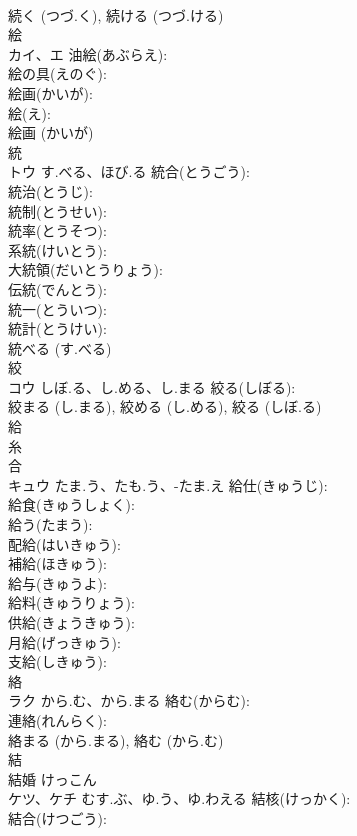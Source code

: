 \documentclass[8pt]{extreport}
\begin{document}
\begin{CJK}{UTF8}{min}
\\	続く (つづ.く), 続ける (つづ.ける)
\\	絵			
\\	カイ、エ		油絵(あぶらえ): 
\\	絵の具(えのぐ): 
\\	絵画(かいが): 
\\	絵(え): 
\\	絵画 (かいが)
\\	統			
\\	トウ	す.べる、ほび.る	統合(とうごう): 
\\	統治(とうじ): 
\\	統制(とうせい): 
\\	統率(とうそつ): 
\\	系統(けいとう): 
\\	大統領(だいとうりょう): 
\\	伝統(でんとう): 
\\	統一(とういつ): 
\\	統計(とうけい): 
\\	統べる (す.べる)
\\	絞			
\\	コウ	しぼ.る、し.める、し.まる	絞る(しぼる): 
\\	絞まる (し.まる), 絞める (し.める), 絞る (しぼ.る)
\\	給			
\\	糸 
\\	合 
\\	キュウ	たま.う、たも.う、-たま.え	給仕(きゅうじ): 
\\	給食(きゅうしょく): 
\\	給う(たまう): 
\\	配給(はいきゅう): 
\\	補給(ほきゅう): 
\\	給与(きゅうよ): 
\\	給料(きゅうりょう): 
\\	供給(きょうきゅう): 
\\	月給(げっきゅう): 
\\	支給(しきゅう): 
\\	絡			
\\	ラク	から.む、から.まる	絡む(からむ): 
\\	連絡(れんらく): 
\\	絡まる (から.まる), 絡む (から.む)
\\	結			
\\	結婚 けっこん 
\\	ケツ、ケチ	むす.ぶ、ゆ.う、ゆ.わえる	結核(けっかく): 
\\	結合(けつごう): 

\end{CJK}
\end{document}
